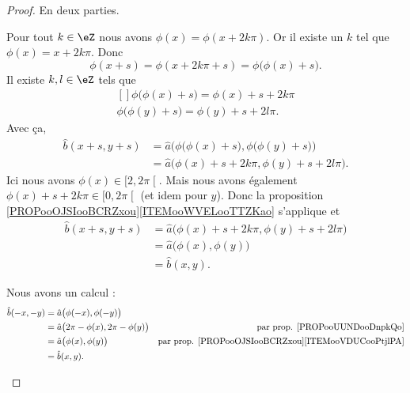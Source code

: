 \begin{proof}
	En deux parties.
	\begin{subproof}
		Pour tout \( k\in \eZ\) nous avons \( \phi(x)=\phi(x+2 k \pi)\). Or il existe un \( k\) tel que \( \phi(x)=x+2k\pi\). Donc
		\begin{equation}
			\phi(x+s)=\phi(x+2k\pi+s)=\phi\big( \phi(x)+s \big).
		\end{equation}
		Il existe \( k,l\in \eZ\) tels que
		\begin{equation}
			\begin{aligned}[]
				\phi\big( \phi(x)+s \big)=\phi(x)+s+2k\pi \\
				\phi\big( \phi(y)+s \big)=\phi(y)+s+2l\pi.
			\end{aligned}
		\end{equation}
		Avec ça,
		\begin{subequations}
			\begin{align}
				\hat b(x+s,y+s) & =\hat a\Big(  \phi\big( \phi(x)+s \big),\phi\big( \phi(y)+s \big) \Big) \\
				                & =\hat a\big( \phi(x)+s+2k\pi,\phi(y)+s+2l\pi \big).
			\end{align}
		\end{subequations}
		Ici nous avons \( \phi(x)\in\mathopen[ 2,2\pi\mathclose[\). Mais nous avons également \( \phi(x)+s+2k\pi\in\mathopen[ 0,2\pi\mathclose[\) (et idem pour \( y\)). Donc la proposition \ref{PROPooOJSIooBCRZxou}\ref{ITEMooWVELooTTZKao} s'applique et
		\begin{subequations}
			\begin{align}
				\hat b(x+s,y+s) & =\hat a\big( \phi(x)+s+2k\pi,\phi(y)+s+2l\pi \big) \\
				                & =\hat a\big( \phi(x),\phi(y) \big)                 \\
				                & =\hat b(x,y).
			\end{align}
		\end{subequations}

		Nous avons un calcul :
		\begin{subequations}		\label{EQooXHPSooHDoiZd}
			\begin{align}
				\hat b(-x,-y) & =\hat a\big( \phi(-x),\phi(-y) \big)                                                                              \\
				              & =\hat a\big( 2\pi-\phi(x),2\pi-\phi(y) \big) & \text{par prop. \ref{PROPooUUNDooDnpkQo}}                          \\
				              & =\hat a\big( \phi(x),\phi(y) \big)           & \text{par prop. \ref{PROPooOJSIooBCRZxou}\ref{ITEMooVDUCooPtjlPA}} \\
				              & =\hat b(x,y).
			\end{align}
		\end{subequations}
	\end{subproof}
\end{proof}
